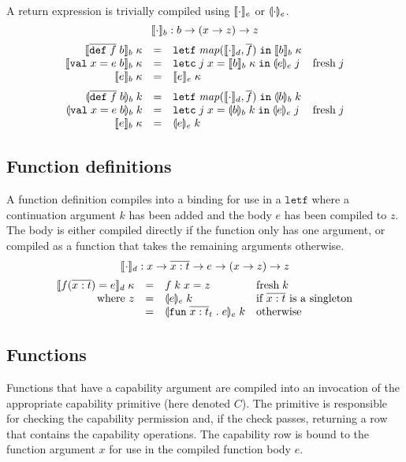 \documentclass[11pt]{article}
\newcommand{\kw}[1]{\mathtt{#1}}
\begin{document}
A return expression is trivially compiled using $\llbracket \cdot \rrbracket_e$ or $\llparenthesis \cdot \rrparenthesis_e$.
\[
    \llbracket \cdot \rrbracket_b : b -> (x -> z) -> z
\]
\[
\begin{array}{rcll}
\cmpk{b}{\fundef{f}{b}} & = &
  \letff{\map{\cmpn{d}}{\rep{f}}}{\cmpk{b}{b}} \\
\cmpk{b}{\valdef{x}{e}{b}} & = &
  \letc{j}{x}{\cmpk{b}{b}}{\tcmpin{e}{e}{j}} & \fresh{j} \\
\cmpk{b}{\return{e}} & = &
  \cmpk{e}{e} \medskip \\

\tcmpk{b}{\fundef{f}{b}} & = &
  \letff{\map{\cmpn{d}}{\rep{f}}}{\tcmpk{b}{b}} \\
\tcmpk{b}{\valdef{x}{e}{b}} & = &
  \letc{j}{x}{\tcmpk{b}{b}}{\tcmpin{e}{e}{j}} & \fresh{j} \\
\cmpk{b}{\return{e}} & = &
  \tcmpk{e}{e} \\
\end{array}
\]

\subsection*{Function definitions}

A function definition compiles into a binding for use in a $\kw{letf}$ where a continuation argument $k$ has been added and the body $e$ has been compiled to $z$.
The body is either compiled directly if the function only has one argument, or compiled as a function that takes the remaining arguments otherwise.
\[
    \llbracket \cdot \rrbracket_d : x -> \overline{x : t} -> e -> (x -> z) -> z
\]
\[
\begin{array}{rcll}
\cmpk{d}{\fd{f}{x}{t}{e}} & = &
  \defterm{f}{k}{x}{z} &
  \fresh{k} \\
\text{where $z$} & = &
  \tcmpk{e}{e} & \text{if $\rep{\arge{x}{t}}$ is a singleton} \\
 & = &
  \tcmpk{e}{\fune{\rep{\arge{x}{t}}_t}{e}} & \text{otherwise} \\
\end{array}
\]

\subsection*{Functions}

Functions that have a capability argument are compiled into an invocation of the appropriate capability primitive (here denoted $C$).
The primitive is responsible for checking the capability permission and, if the check passes, returning a row that contains the capability operations.
The capability row is bound to the function argument $x$ for use in the compiled function body $e$.
\end{document}
